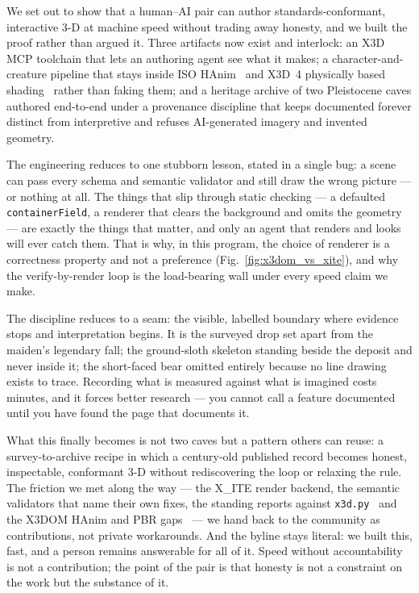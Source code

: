 \documentclass[11pt]{article}
\newcommand{\xite}{X\_ITE}
\begin{document}
We set out to show that a human--AI pair can author standards-conformant, interactive 3-D at machine speed without trading away honesty, and we built the proof rather than argued it. Three artifacts now exist and interlock: an X3D MCP toolchain that lets an authoring agent see what it makes; a character-and-creature pipeline that stays inside ISO HAnim~\cite{hanim} and X3D~4 physically based shading~\cite{x3d4} rather than faking them; and a heritage archive of two Pleistocene caves authored end-to-end under a provenance discipline that keeps documented forever distinct from interpretive and refuses AI-generated imagery and invented geometry.

The engineering reduces to one stubborn lesson, stated in a single bug: a scene can pass every schema and semantic validator and still draw the wrong picture --- or nothing at all. The things that slip through static checking --- a defaulted \texttt{containerField}, a renderer that clears the background and omits the geometry --- are exactly the things that matter, and only an agent that renders and looks will ever catch them. That is why, in this program, the choice of renderer is a correctness property and not a preference (Fig.~\ref{fig:x3dom_vs_xite}), and why the verify-by-render loop is the load-bearing wall under every speed claim we make.

The discipline reduces to a seam: the visible, labelled boundary where evidence stops and interpretation begins. It is the surveyed drop set apart from the maiden's legendary fall; the ground-sloth skeleton standing beside the deposit and never inside it; the short-faced bear omitted entirely because no line drawing exists to trace. Recording what is measured against what is imagined costs minutes, and it forces better research --- you cannot call a feature documented until you have found the page that documents it.

What this finally becomes is not two caves but a pattern others can reuse: a survey-to-archive recipe in which a century-old published record becomes honest, inspectable, conformant 3-D without rediscovering the loop or relaxing the rule. The friction we met along the way --- the \xite{} render backend, the semantic validators that name their own fixes, the standing reports against \texttt{x3d.py}~\cite{x3dpy} and the X3DOM HAnim and PBR gaps~\cite{x3dom} --- we hand back to the community as contributions, not private workarounds. And the byline stays literal: we built this, fast, and a person remains answerable for all of it. Speed without accountability is not a contribution; the point of the pair is that honesty is not a constraint on the work but the substance of it.
\end{document}
